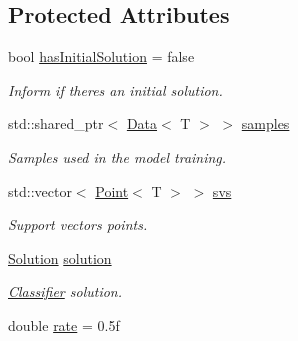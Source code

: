 \subsection*{Protected Attributes}
\begin{DoxyCompactItemize}
\item 
bool \hyperlink{class_classifier_a914e488b477b9237cf991ff0b485c6c7}{has\+Initial\+Solution} = false\hypertarget{class_classifier_a914e488b477b9237cf991ff0b485c6c7}{}\label{class_classifier_a914e488b477b9237cf991ff0b485c6c7}

\begin{DoxyCompactList}\small\item\em Inform if there\textquotesingle{}s an initial solution. \end{DoxyCompactList}\item 
std\+::shared\+\_\+ptr$<$ \hyperlink{class_data}{Data}$<$ T $>$ $>$ \hyperlink{class_classifier_a0000b47a2e0784ada4c52d7046c4adb8}{samples}\hypertarget{class_classifier_a0000b47a2e0784ada4c52d7046c4adb8}{}\label{class_classifier_a0000b47a2e0784ada4c52d7046c4adb8}

\begin{DoxyCompactList}\small\item\em Samples used in the model training. \end{DoxyCompactList}\item 
std\+::vector$<$ \hyperlink{class_point}{Point}$<$ T $>$ $>$ \hyperlink{class_classifier_ae8695222e93f7fea1a1e585d4c126f7d}{svs}\hypertarget{class_classifier_ae8695222e93f7fea1a1e585d4c126f7d}{}\label{class_classifier_ae8695222e93f7fea1a1e585d4c126f7d}

\begin{DoxyCompactList}\small\item\em Support vectors points. \end{DoxyCompactList}\item 
\hyperlink{class_solution}{Solution} \hyperlink{class_classifier_adecdc97505c2911a66e240ad0fefd9ea}{solution}\hypertarget{class_classifier_adecdc97505c2911a66e240ad0fefd9ea}{}\label{class_classifier_adecdc97505c2911a66e240ad0fefd9ea}

\begin{DoxyCompactList}\small\item\em \hyperlink{class_classifier}{Classifier} solution. \end{DoxyCompactList}\item 
double \hyperlink{class_classifier_a7b1c4ef87631bd9e46682e5bc4315111}{rate} = 0.\+5f\hypertarget{class_classifier_a7b1c4ef87631bd9e46682e5bc4315111}{}\label{class_classifier_a7b1c4ef87631bd9e46682e5bc4315111}


\end{DoxyCompactItemize}
